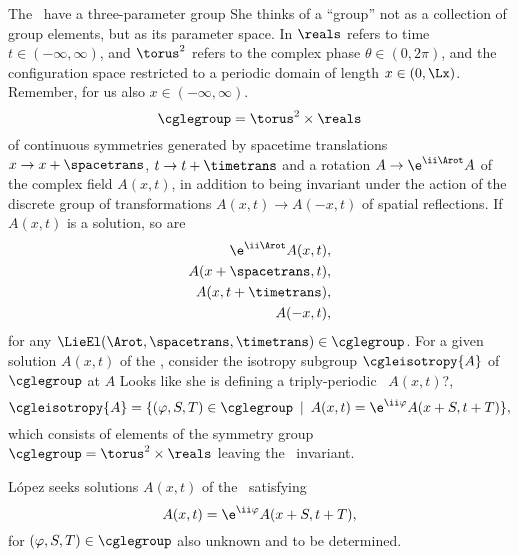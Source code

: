 \begin{description}
{The \cGL\ have a three-parameter group
{She thinks of a ``group'' not as a collection of group elements,
but as its parameter space. In  $\reals$ refers to
time $t\in(-\infty,\infty)$, and $\torus^2$ refers to
the complex phase $\theta \in (0,2\pi)$, and the configuration space restricted
to a periodic domain of length $x \in (0,\Lx)$. Remember, for us also
$x\in(-\infty,\infty)$.
}
\begin{equation}    \label{eqn:Ggroup}
    \cglegroup = \torus^2 \times \reals
\end{equation}
of continuous symmetries generated by spacetime translations $x \rightarrow x
+ \spacetrans$, $t \rightarrow t + \timetrans$ and a rotation $A \rightarrow
\e^{\ii\Arot}A$ of the complex field $A(x, t)$, in addition to being invariant
under the action of the discrete group of transformations $A(x,t) \rightarrow
A(-x,t)$ of spatial reflections.  If $A(x, t)$ is a solution,
so are
\begin{align}
    \e^{\ii\Arot} A(x, t)&,            \label{cglesym1} \\
    A(x + \spacetrans, t)&,       \label{cglesym2} \\
    A(x, t + \timetrans)&,          \label{cglesym3} \\
    A(-x, t)&,                              \label{cglesym4}
\end{align}
for any $\LieEl(\Arot, \spacetrans, \timetrans) \in \cglegroup$.
For a given solution $A(x,t)$ of the {\cGLe}, consider the
isotropy subgroup $\cgleisotropy{A}$ of $\cglegroup$ at $A$
{Looks like she is defining a triply-periodic \rpo\ $A(x,t)$?},
\begin{equation}     \label{eqn:isotropy_subgroup}
    \cgleisotropy{A}  =  \{ (\varphi, S, T) \in \cglegroup \ \, | \ \,  A(x,t) =  \e^{\ii \varphi} A(x+S, t+T) \},
\end{equation}
which consists of elements of the symmetry group $\cglegroup = \torus^2 \times
\reals$  leaving the \cGLe\ invariant.

L\'{o}pez seeks solutions $A(x,t)$ of the \cGLe\ satisfying
\begin{equation}   \label{eqn:cgle_invariant_solution}
    A(x,t)  =  \e^{\ii \varphi} A(x+S, t+T),
\end{equation}
for $(\varphi, S, T) \in \cglegroup$ also unknown and to be determined.

}
\end{description}
